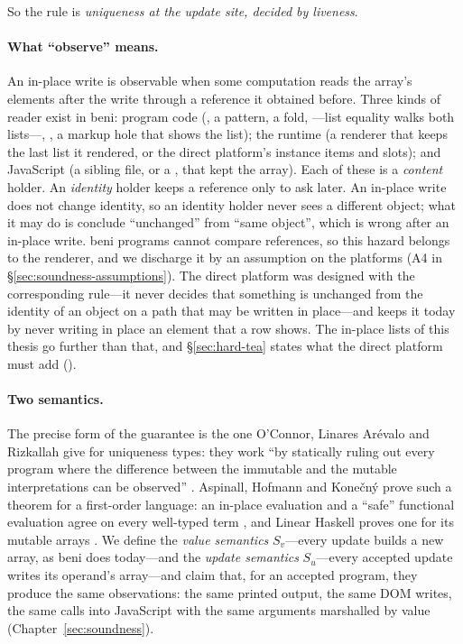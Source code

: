 So the rule is \emph{uniqueness at the update site, decided by liveness}.

\paragraph{What ``observe'' means.} An in-place write is observable when some computation reads
the array's elements after the write through a reference it obtained before. Three kinds of reader
exist in beni: program code (, a pattern, a fold, \code{==}---list equality walks both
lists---, , a markup hole that shows the list); the runtime (a renderer that keeps
the last list it rendered, or the direct platform's instance items and slots); and JavaScript (a
sibling file, or a , that kept the array). Each of these is a \emph{content} holder. An
\emph{identity} holder keeps a reference only to ask \code{===} later. An in-place write does not
change identity, so an identity holder never sees a different object; what it may do is conclude
``unchanged'' from ``same object'', which is wrong after an in-place write. beni programs cannot
compare references, so this hazard belongs to the renderer, and we discharge it by an assumption on
the platforms (A4 in \S\ref{sec:soundness-assumptions}). The direct platform was designed with the
corresponding rule---it never decides that something is unchanged from the identity of an object on a
path that may be written in place---and keeps it today by never writing in place an element that a row
shows. The in-place lists of this thesis go further than that, and \S\ref{sec:hard-tea} states what the
direct platform must add ().

\paragraph{Two semantics.} The precise form of the guarantee is the one O'Connor, Linares
Ar\'evalo and Rizkallah give for uniqueness types: they work ``by statically ruling out every
program where the difference between the immutable and the mutable interpretations can be
observed'' \citep{oconnor2026separation}. Aspinall, Hofmann and Kone\v{c}n\'y prove such a theorem
for a first-order language: an in-place evaluation and a ``safe'' functional evaluation agree on every
well-typed term \citep[Thm.~5.8]{aspinall2008usage}, and Linear Haskell proves one for its mutable
arrays \citep{bernardy2018linear}. We define the \emph{value semantics} $S_v$---every
update builds a new array, as beni does today---and the \emph{update semantics} $S_u$---every
accepted update writes its operand's array---and claim that, for an accepted program, they produce
the same observations: the same printed output, the same DOM writes, the same calls into JavaScript
with the same arguments marshalled by value (Chapter~\ref{sec:soundness}).

